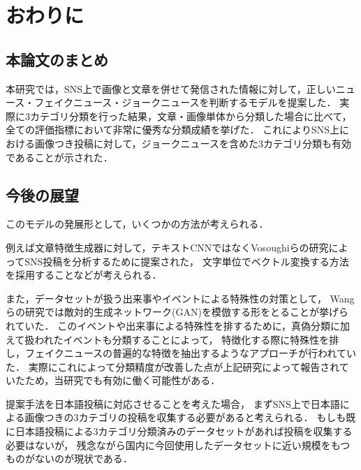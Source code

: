 %
\chapter{おわりに}
%
\section{本論文のまとめ}
本研究では，SNS上で画像と文章を併せて発信された情報に対して，正しいニュース・フェイクニュース・ジョークニュースを判断するモデルを提案した．
実際に3カテゴリ分類を行った結果，文章・画像単体から分類した場合に比べて，全ての評価指標において非常に優秀な分類成績を挙げた．
これによりSNS上における画像つき投稿に対して，ジョークニュースを含めた3カテゴリ分類も有効であることが示された．
%
\section{今後の展望}
このモデルの発展形として，いくつかの方法が考えられる．

例えば文章特徴生成器に対して，テキストCNNではなくVosoughiらの研究\cite{Vosoughi:2016:TLT:2911451.2914762}によってSNS投稿を分析するために提案された，
文字単位でベクトル変換する方法を採用することなどが考えられる．

また，データセットが扱う出来事やイベントによる特殊性の対策として，
Wangらの研究\cite{Wang:2018:EEA:3219819.3219903}では敵対的生成ネットワーク(GAN)を模倣する形をとることが挙げられていた．
このイベントや出来事による特殊性を排するために，真偽分類に加えて扱われたイベントも分類することによって，
特徴化する際に特殊性を排し，フェイクニュースの普遍的な特徴を抽出するようなアプローチが行われていた．
実際にこれによって分類精度が改善した点が上記研究によって報告されていたため，当研究でも有効に働く可能性がある．

提案手法を日本語投稿に対応させることを考えた場合，
まずSNS上で日本語による画像つきの3カテゴリの投稿を収集する必要があると考えられる．
もしも既に日本語投稿による3カテゴリ分類済みのデータセットがあれば投稿を収集する必要はないが，
残念ながら国内に今回使用したデータセットに近い規模をもつものがないのが現状である．

% 
